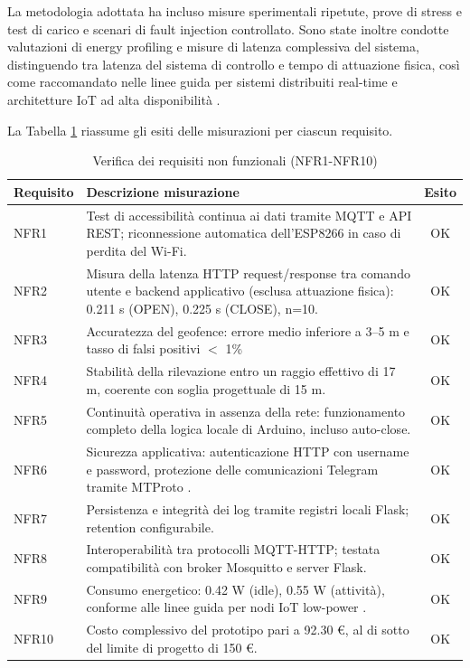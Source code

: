 La metodologia adottata ha incluso misure sperimentali ripetute, prove di stress e test di carico e scenari di fault injection controllato. Sono state inoltre condotte valutazioni di energy profiling e misure di latenza complessiva del sistema, distinguendo tra latenza del sistema di controllo e tempo di attuazione fisica, così come raccomandato nelle linee guida per sistemi distribuiti real-time \cite{Lee2015} e architetture IoT ad alta disponibilità \cite{Zanella2014}.

La Tabella \ref{tab:nfr_tests} riassume gli esiti delle misurazioni per ciascun requisito.

\begin{table}[h!]
    \centering
    \caption{Verifica dei requisiti non funzionali (NFR1-NFR10)}
    \label{tab:nfr_tests}
    \begin{tabular}{|p{1.5cm}|p{9.5cm}|c|}
    \hline
    \textbf{Requisito} & \textbf{Descrizione misurazione} & \textbf{Esito} \\ \hline
    NFR1 & Test di accessibilità continua ai dati tramite MQTT e API REST; riconnessione automatica dell'ESP8266 in caso di perdita del Wi-Fi. & OK \\ \hline
    NFR2 & Misura della latenza HTTP request/response tra comando utente e backend applicativo (esclusa attuazione fisica): 0.211 s (OPEN), 0.225 s (CLOSE), n=10. & OK \\ \hline
    NFR3 & Accuratezza del geofence: errore medio inferiore a 3--5 m e tasso di falsi positivi $<$ 1\% & OK \\ \hline
    NFR4 & Stabilità della rilevazione entro un raggio effettivo di 17 m, coerente con soglia progettuale di 15 m. & OK \\ \hline
    NFR5 & Continuità operativa in assenza della rete: funzionamento completo della logica locale di Arduino, incluso auto-close. & OK \\ \hline
    NFR6 & Sicurezza applicativa: autenticazione HTTP con username e password, protezione delle comunicazioni Telegram tramite MTProto \cite{Kuznetsov2018}. & OK \\ \hline
    NFR7 & Persistenza e integrità dei log tramite registri locali Flask; retention configurabile. & OK \\ \hline
    NFR8 & Interoperabilità tra protocolli MQTT-HTTP; testata compatibilità con broker Mosquitto e server Flask. & OK \\ \hline
    NFR9 & Consumo energetico: 0.42 W (idle), 0.55 W (attività), conforme alle linee guida per nodi IoT low-power \cite{Gubbi2013}. & OK \\ \hline
    NFR10 & Costo complessivo del prototipo pari a 92.30 €, al di sotto del limite di progetto di 150 €. & OK \\ \hline
    \end{tabular}
\end{table}

